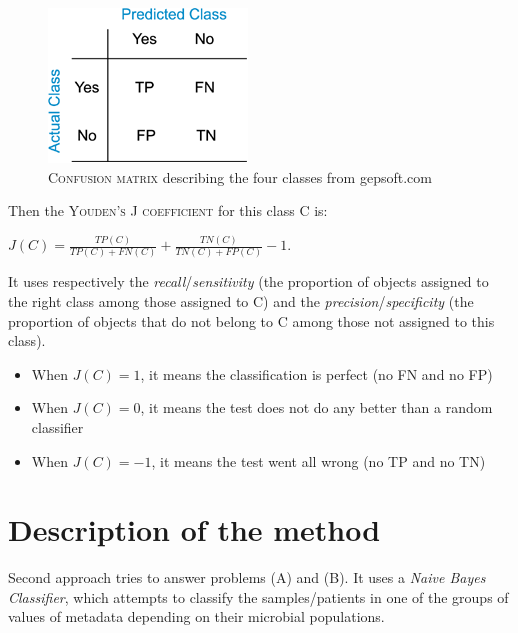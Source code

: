 \documentclass{report}
\begin{document}
\begin{figure}[H]
\centering
\includegraphics[scale=0.5]{illustrations/confusionmatrix.png}
\caption{\textsc{Confusion matrix} describing the four classes from gepsoft.com}
\end{figure}

Then the \textsc{Youden's J coefficient} for this class \textsc{C} is:\\

\begin{center}
$J(C) = \frac{TP(C)}{TP(C) + FN(C)} + \frac{TN(C)}{TN(C) + FP(C)} - 1$.\\
\end{center}

It uses respectively the \emph{recall}/\emph{sensitivity}\cite{F-measure} (the proportion of objects assigned to the right class among those assigned to \textsc{C}) and the \emph{precision}/\emph{specificity}\cite{F-measure} (the proportion of objects that do not belong to \textsc{C} among those not assigned to this class).\\

\begin{itemize}
\item When $J(C) = 1$, it means the classification is perfect (no \textsc{FN} and no \textsc{FP})
\item When $J(C) = 0$, it means the test does not do any better than a random classifier
\item When $J(C) = -1$, it means the test went all wrong (no \textsc{TP} and no \textsc{TN})
\end{itemize}

\section{Description of the method}

Second approach tries to answer problems (\textsc{A}) and (\textsc{B}). It uses a \emph{Naive Bayes Classifier}, which attempts to classify the samples/patients in one of the groups of values of metadata depending on their microbial populations.\\
\end{document}
